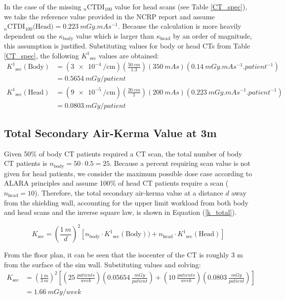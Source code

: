 \documentclass[%
aps,
mph,%
amsmath,amssymb,
preprint,%
tightenlines,
longbibliography,
superscriptaddress,
floatfix,
nofootinbib,
]{revtex4-2}
\begin{document}
        In the case of the missing $_n\mathrm{CTDI}_{100}$ value for head scans (see Table \ref{CT_spec}), we take the reference value provided in the NCRP report and assume $_n\mathrm{CTDI}_{100}\text{(Head)} = \qty[mode = text]{0.223}{mGy.mAs^{-1}}$. Because the calculation is more heavily dependent on the $\kappa\mathrm{_{body}}$ value which is larger than $\kappa\mathrm{_{head}}$ by an order of magnitude, this assumption is justified. Substituting values for body or head CTs from Table \ref{CT_spec}, the following $ K^1\mathrm{_{sec}}$ values are obtained:
        \begin{align*}
            K^1\mathrm{_{sec}(Body)} &= \left(\SI{3e-4}{\per \cm}\right)\left(\frac{\SI{50}{cm}}{1.3}\right)(\SI{350}{mAs})\left(\qty[mode = text]{0.14}{mGy.mAs^{-1}.patient^{-1}}\right) \\
            &= \SI{0.5654}{mGy/patient}\\
            K^1\mathrm{_{sec}(Head)} &= \left(\SI{9e-5}{\per \cm}\right)\left(\frac{\SI{20}{cm}}{1}\right)(\SI{200}{mAs})\left(\qty[mode = text]{0.223}{mGy.mAs^{-1}.patient^{-1}}\right) \\
            &= \SI{0.0803}{mGy/patient}
        \end{align*}

    \subsection{Total Secondary Air-Kerma Value at 3\hspace{0.85pt}m}
        Given 50\% of body CT patients required a CT scan, the total number of body CT patients is $n\mathrm{_{body}} = 50\cdot0.5 = 25$. Because a percent requiring scan value is not given for head patients, we consider the maximum possible dose case according to ALARA principles and assume 100\% of head CT patients require a scan ($n\mathrm{_{head}} = 10$). Therefore, the total secondary air-kerma value at a distance $d$ away from the shielding wall, accounting for the upper limit workload from both body and head scans and the inverse square law, is shown in Equation (\ref{k_total}). 

        \begin{equation}\label{k_total}
            K\mathrm{_{sec}} = \left(\frac{\qty{1}{m}}{d}\right)^2 [n\mathrm{_{body}}\cdot K^1\mathrm{_{sec}(Body)}) + n\mathrm{_{head}}\cdot K^1\mathrm{_{sec}(Head)}]
        \end{equation}
        
        From the floor plan, it can be seen that the isocenter of the CT is roughly 3 m from the surface of the sim wall. Substituting values and solving: 
        \begin{align*}
            K\mathrm{_{sec}} &= \left(\frac{\qty{1}{m}}{\qty{3}{m}}\right)^2\left[\left(\qty{25}{\frac{patients}{week}}\right)\left(\SI{0.05654}{\frac{mGy}{patient}}\right)+ \left(\qty{10}{\frac{patients}{week}}\right)\left(\SI{0.0803}{\frac{mGy}{patient}}\right)\right]\\
            &= \SI{1.66}{mGy/week}
        \end{align*}
        
\end{document}

